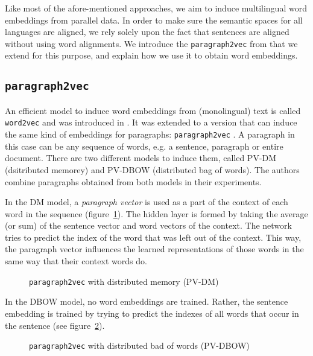 Like most of the afore-mentioned approaches, we aim to induce multilingual word embeddings from parallel data. In order to make sure the semantic spaces for all languages are aligned, we rely solely upon the fact that sentences are aligned without using word alignments.
We introduce the \texttt{paragraph2vec} from \cite{Le2014} that we extend for this purpose, and explain how we use it to obtain word embeddings.


\subsection{\texttt{paragraph2vec}}
An efficient model to induce word embeddings from (monolingual) text is called \texttt{word2vec}  and was introduced in \cite{mikolov2013efficient}. It was extended to a version that can induce the same kind of embeddings for paragraphs: \texttt{paragraph2vec} \cite{Le2014}. A paragraph in this case can be any sequence of words, e.g. a sentence, paragraph or entire document. There are two different models to induce them, called PV-DM (dsitributed memorey) and PV-DBOW (distributed bag of words). The authors combine paragraphs obtained from both models in their experiments.

In the DM model, a \emph{paragraph vector} is used as a part of the context of each word in the sequence (figure~\ref{fig:p2v-DM}).
The hidden layer is formed by taking the average (or sum) of the sentence vector and word vectors of the context. The network tries to predict the index of the word that was left out of the context.  
This way, the paragraph vector influences the learned representations of those words in the same way that their context words do.

\begin{figure}\center

\caption{\texttt{paragraph2vec} with distributed memory (PV-DM)}
\label{fig:p2v-DM}
\end{figure}

In the DBOW model, no word embeddings are trained. Rather, the sentence embedding is trained by trying to predict the indexes of all words that occur in the sentence (see figure~\ref{fig:p2v-DBOW}).

\begin{figure}\center

\caption{\texttt{paragraph2vec} with distributed bad of words (PV-DBOW)}
\label{fig:p2v-DBOW}
\end{figure}




